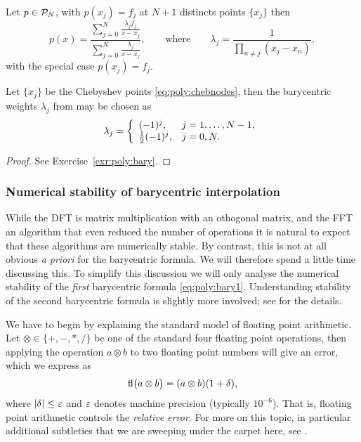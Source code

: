 \begin{theorem}
   \label{th:poly:bary}
   Let $p \in \mathcal{P}_N$, with $p(x_j) = f_j$ at $N+1$ distincts points 
   $\{x_j\}$ then 
   \[
      p(x) = \frac{ 
         \sum_{j = 0}^N \frac{\lambda_j f_j}{x-x_j} 
      }{
         \sum_{j = 0}^N \frac{\lambda_j}{x-x_j}
      }, 
      \qquad \text{where} \qquad 
      \lambda_j = \frac{1}{ \prod_{n \neq j} (x_j-x_n)},
   \] 
   with the special case $p(x_j) = f_j$.
\end{theorem}

\begin{theorem}
   \label{th:poly:barycheb}
   Let $\{x_j\}$ be the Chebyshev points \eqref{eq:poly:chebnodes}, then 
   the barycentric weights $\lambda_j$ from  
   may be chosen as 
   \[
       \lambda_j = \left\{ \begin{array}{ll}  
          (-1)^j, & j = 1, \dots, N-1, \\ 
          \frac12 (-1)^j, & j = 0, N.  \end{array} \right.
   \]
\end{theorem}
\begin{proof}
   See Exercise~\ref{exr:poly:bary}. 
\end{proof}

\subsubsection{Numerical stability of barycentric interpolation}
%
\label{sec:poly:barystab}
%
While the DFT is matrix multiplication with an othogonal matrix, and the FFT 
an algorithm that even reduced the number of operations it is natural to 
expect that these algorithms are numerically stable. By contrast, this is 
not at all obvious {\it a priori} for the barycentric formula. We will therefore 
spend a little time discussing this. 
%
To simplify this discussion we will only analyse the numerical stability 
of the {\em first} barycentric formula \eqref{eq:poly:bary1}. Understanding 
stability of the second barycentric formula is slightly more involved; 
see \cite{Higham2004-fn} for the details. 

We have to begin by explaining the standard model of floating point arithmetic. 
Let $\otimes \in \{ +, -, *,  / \}$ be one of the standard four floating point 
operations, then applying the operation $a \otimes b$  to two floating point
numbers will give an error, which we express as 
\[
   {\rm fl}\big( a \otimes b \big) = (a\otimes b)(1+\delta),
\]
where $|\delta| \leq \varepsilon$ and $\varepsilon$ denotes machine precision (typically
$10^{-6}$). That is, floating point arithmetic controls the {\em relative
error}. For more on this topic, in particular additional subtleties that we are
sweeping under the carpet here, see \cite{Higham2002-nk}.


